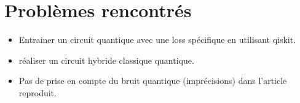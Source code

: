 \documentclass[11pt,a4paper]{article}
\begin{document}
\section{Problèmes rencontrés}

\begin{itemize}
    \item Entrainer un circuit quantique avec une loss spécifique en utilisant qiskit.
    \item réaliser un circuit hybride classique quantique.
    \item Pas de prise en compte du bruit quantique (imprécisions) dans l'article reproduit.
\end{itemize}

\newpage
\printbibliography
\end{document}
